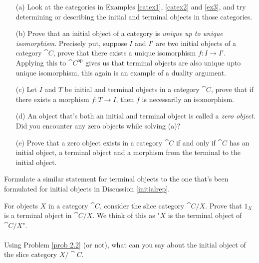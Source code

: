 \begin{problem}\label{prob 4.1}\hfill
\begin{itemize}
\item[(a)] Look at the categories in Examples \ref{catex1}, \ref{catex2} and \ref{ex3}, and try determining or describing the initial and terminal objects in those categories.
\item[(b)] Prove that an initial object of a category is \emph{unique up to unique isomorphism}. Precisely put, suppose $I$ and $I'$ are two initial objects of a category $\cat{C}$, prove that there exists a unique isomorphism $f: I \to I'$.\\[0.5em]
Applying this to $\cat{C}^{\text{op}}$ gives us that terminal objects are also unique upto unique isomorphism, this again is an example of a duality argument.
\item[(c)] Let $I$ and $T$ be initial and terminal objects in a category $\cat{C}$, prove that if there exists a morphism $f: T \to I$, then $f$ is necessarily an isomorphism.
\item[(d)] An object that's both an initial and terminal object is called a \emph{zero object}. Did you encounter any zero objects while solving (a)?

\item[(e)] Prove that a zero object exists in a category $\cat{C}$ if and only if $\cat{C}$ has an initial object, a terminal object and a morphism from the terminal to the initial object.
\end{itemize}
\end{problem}

\vspace{0.1in}

\begin{problem}\label{prob 4.2}
Formulate a similar statement for terminal objects to the one that's been formulated for initial objects in Discussion \ref{initialrep}.
\end{problem}

\vspace{0.1in}

\begin{problem}\label{prob 4.2a}
For objects $X$ in a category $\cat{C}$, consider the slice category $\cat{C}/X$. Prove that $1_X$ is a terminal object in $\cat{C}/X$. We think of this as "$X$ is the terminal object of $\cat{C}/X$".\\
\\
Using Problem \ref{prob 2.2} (or not), what can you say about the initial object of the slice category $X/\cat{C}$.
\end{problem}

